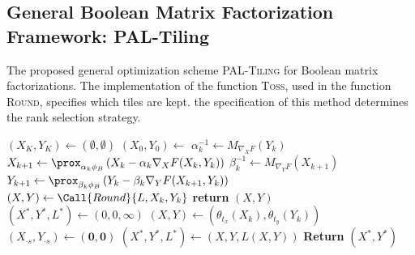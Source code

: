 \subsection{General Boolean Matrix Factorization Framework:  PAL-Tiling }\label{sec:PT:vanillaAlg}
\begin{algorithm}[t]
\caption{The proposed general optimization scheme \textsc{PAL-Tiling} for Boolean matrix factorizations. The implementation of the function \textsc{Toss}, used in the function \textsc{Round}, specifies which tiles are kept. the specification of this method determines the rank selection strategy.}
\begin{algorithmic}[1]
    \State $(X_K,Y_K)\gets (\emptyset, \emptyset)$
    \State $(X_0,Y_0) \gets $  \label{alg:paltiling:increaseRank}
    \label{alg:paltiling:opt} 
    	\State $\alpha_k^{-1} \gets M_{\nabla_XF}(Y_k)$
        \State $X_{k+1} \gets \prox_{\alpha_k\phi_B}\left(X_k-\alpha_k\nabla_XF(X_k,Y_k)\right)$
       	\State $\beta_k^{-1} \gets M_{\nabla_YF}(X_{k+1})$
        \State $Y_{k+1} \gets \prox_{\beta_k\phi_B}\left(Y_k-\beta_k\nabla_YF(X_{k+1},Y_k)\right)$
    \EndFor
    \State $(X,Y)\gets \Call{Round}{L,X_k,Y_k}$  \label{alg:paltiling:round}
    	\textbf{return} $(X,Y)$
    \EndIIf \label{alg:paltiling:rankGap}
    \EndFor
  \EndFunction
  \Statex ~
  \State $(X^*,Y^*,L^*)\gets (0,0,\infty)$
    \State $(X,Y)\gets \left(\theta_{t_x}(X_k),\theta_{t_y}(Y_k)\right)$
         $(X_{\cdot s},Y_{\cdot s})\gets (\mathbf{0},\mathbf{0})$ \label{alg:paltiling:toss}
        \EndIIf
    \EndFor
     $(X^*,Y^*,L^*)\gets (X,Y,L(X,Y))$
    \EndIIf
  \EndFor
  \State \textbf{Return} $(X^*,Y^*)$
  \EndFunction
\end{algorithmic}
\label{alg:paltiling}
\end{algorithm}
